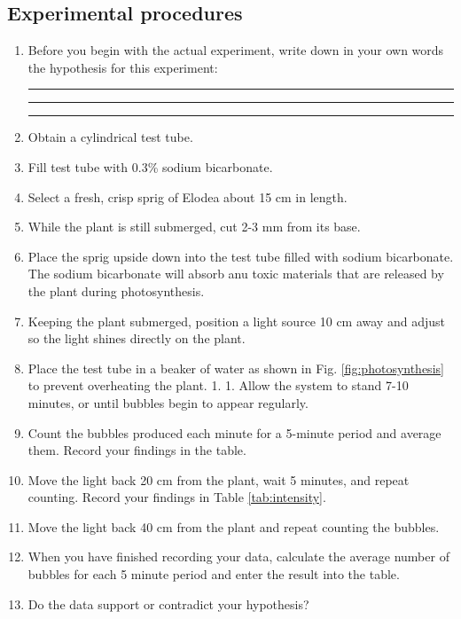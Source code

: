 \documentclass[]{book}
\begin{document}
\hypertarget{experimental-procedures-24}{%
\subsection{Experimental procedures}\label{experimental-procedures-24}}

\begin{enumerate}
\def\labelenumi{\arabic{enumi}.}
\item
  Before you begin with the actual experiment, write down in your own words the hypothesis for this experiment:

  \begin{center}\rule{0.5\linewidth}{\linethickness}\end{center}

  \begin{center}\rule{0.5\linewidth}{\linethickness}\end{center}

  \begin{center}\rule{0.5\linewidth}{\linethickness}\end{center}
\item
  Obtain a cylindrical test tube.
\item
  Fill test tube with 0.3\% sodium bicarbonate.
\item
  Select a fresh, crisp sprig of Elodea about 15 cm in length.
\item
  While the plant is still submerged, cut 2-3 mm from its base.
\item
  Place the sprig upside down into the test tube filled with sodium bicarbonate. The sodium bicarbonate will absorb anu toxic materials that are released by the plant during photosynthesis.
\item
  Keeping the plant submerged, position a light source 10 cm away and adjust so the light shines directly on the plant.
\item
  Place the test tube in a beaker of water as shown in Fig. \ref{fig:photosynthesis} to prevent overheating the plant. 1. 1. Allow the system to stand 7-10 minutes, or until bubbles begin to appear regularly.
\item
  Count the bubbles produced each minute for a 5-minute period and average them. Record your findings in the table.
\item
  Move the light back 20 cm from the plant, wait 5 minutes, and repeat counting. Record your findings in Table \ref{tab:intensity}.
\item
  Move the light back 40 cm from the plant and repeat counting the bubbles.
\item
  When you have finished recording your data, calculate the average number of bubbles for each 5 minute period and enter the result into the table.
\item
  Do the data support or contradict your hypothesis?
\end{enumerate}
\end{document}
